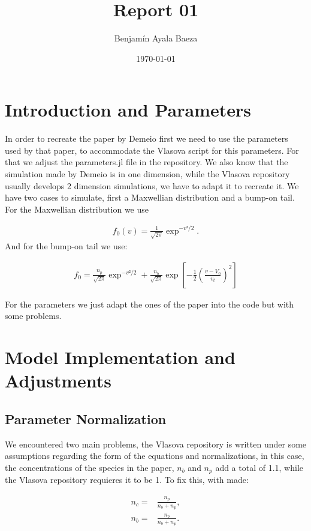 \documentclass[a4paper]{article}
\title{Report 01}
\author{Benjamín Ayala Baeza}
\date{\today}
\begin{document}
\maketitle
 \emph{\lipsum[1]}
\section{Introduction and Parameters}
In order to recreate the paper by Demeio \cite{demeio1990} first we need to use the parameters used by that paper, to accommodate the Vlasova script for this parameters. 
For that we adjust the parameters.jl file in the repository. We also know that the simulation made by Demeio is in one dimension, while the Vlasova repository usually develops 2 dimension simulations, we have to adapt it to recreate it.
We have two cases to simulate, first a Maxwellian distribution and a bump-on tail.\\
For the Maxwellian distribution we use 

    \begin{align}
        f_0(v) = \frac{1}{\sqrt{2\pi}}\exp^{-v²/2}.\label{eq:maxwellian-distr}
    \end{align}
And for the bump-on tail we use:

    \begin{align}
        f_0= \frac{n_p}{\sqrt{2\pi}} \exp^{-v²/2} + \frac{n_b}{\sqrt{2\pi}} \exp \left[ -\frac{1}{2} \left( \frac{v-V_0}{v_t} \right)^2 \right] \label{eq:bumb-tail-distr}
    \end{align}

For the parameters we just adapt the ones of the paper into the code but with some problems. 

\section{Model Implementation and Adjustments}

    \subsection{Parameter Normalization}
        We encountered two main problems, the Vlasova repository is written under some assumptions regarding the form of the equations and normalizations,
        in this case, the concentrations of the species in the paper, $n_b$ and $n_p$ add a total of 1.1, while the Vlasova repository requieres it to be 1. To fix this, with made:

            \begin{align}
                n_c =& \frac{n_p}{n_b + n_p}, \\
                n_b =& \frac{n_b}{n_b + n_p}.
            \end{align}
\end{document}
